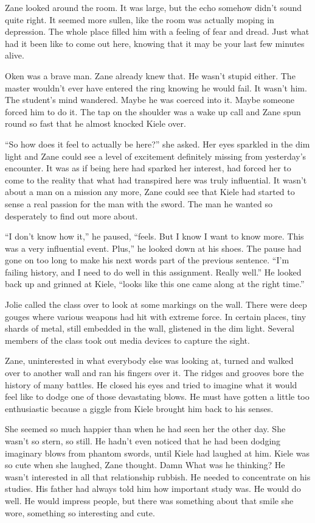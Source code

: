 Zane looked around the room.  It was large, but the echo somehow didn't sound quite right.  It seemed more sullen, like the room was actually moping in depression.  The whole place filled him with a feeling of fear and dread.  Just what had it been like to come out here, knowing that it may be your last few minutes alive.  

Oken was a brave man.  Zane already knew that.  He wasn't stupid either.  The master wouldn't ever have entered the ring knowing he would fail.  It wasn't him.  The student's mind wandered.  Maybe he was coerced into it.  Maybe someone forced him to do it.  The tap on the shoulder was a wake up call and Zane spun round so fast that he almost knocked Kiele over.

``So how does it feel to actually be here?'' she asked.  Her eyes sparkled in the dim light and Zane could see a level of excitement definitely missing from yesterday's encounter.  It was as if being here had sparked her interest, had forced her to come to the reality that what had transpired here was truly influential.  It wasn't about a man on a mission any more, Zane could see that Kiele had started to sense a real passion for the man with the sword.  The man he wanted so desperately to find out more about.

``I don't know how it,'' he paused, ``feels.  But I know I want to know more.  This was a very influential event.  Plus,'' he looked down at his shoes.  The pause had gone on too long to make his next words part of the previous sentence.  ``I'm failing history, and I need to do well in this assignment.  Really well.''  He looked back up and grinned at Kiele, ``looks like this one came along at the right time.''

Jolie called the class over to look at some markings on the wall.  There were deep gouges where various weapons had hit with extreme force.  In certain places, tiny shards of metal, still embedded in the wall, glistened in the dim light.  Several members of the class took out media devices to capture the sight.  

Zane, uninterested in what everybody else was looking at, turned and walked over to another wall and ran his fingers over it.  The ridges and grooves bore the history of many battles.  He closed his eyes and tried to imagine what it would feel like to dodge one of those devastating blows.  He must have gotten a little too enthusiastic because a giggle from Kiele brought him back to his senses.

She seemed so much happier than when he had seen her the other day.  She wasn't so stern, so still.  He hadn't even noticed that he had been dodging imaginary blows from phantom swords, until Kiele had laughed at him.  Kiele was so cute when she laughed, Zane thought.  Damn  What was he thinking?  He wasn't interested in all that relationship rubbish.  He needed to concentrate on his studies.  His father had always told him how important study was.  He would do well.  He would impress people, but there was something about that smile she wore, something so interesting and cute.

